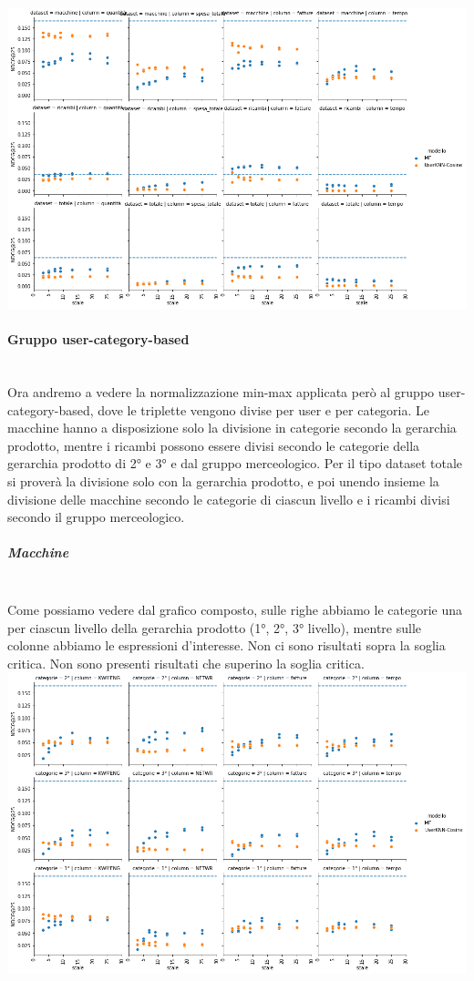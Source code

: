 \includegraphics[width=16cm]{figures/risultati_minmax_singolo.png}
\newpage
\paragraph{Gruppo user-category-based}\mbox{} \\
Ora andremo a vedere la normalizzazione min-max applicata però al gruppo user-category-based, dove le triplette vengono divise per user e per categoria.
Le macchine hanno a disposizione solo la divisione in categorie secondo la gerarchia prodotto, mentre i ricambi possono essere divisi secondo le categorie della gerarchia prodotto di 2° e 3° e dal gruppo merceologico. Per il tipo dataset totale si proverà la divisione solo con la gerarchia prodotto, e poi unendo insieme la divisione delle macchine secondo le categorie di ciascun livello e i ricambi divisi secondo il gruppo merceologico.

\subparagraph{Macchine}\mbox{} \\
Come possiamo vedere dal grafico composto, sulle righe abbiamo le categorie una per ciascun livello della gerarchia prodotto (1°, 2°, 3° livello), mentre sulle colonne abbiamo le espressioni d'interesse. Non ci sono risultati sopra la soglia critica. Non sono presenti risultati che superino la soglia critica.\\

\includegraphics[width=16cm]{figures/risultati_minmax_categoria_macchine.png}
\newpage

